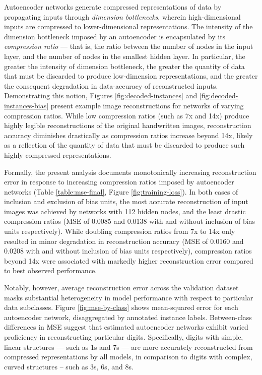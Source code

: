 
Autoencoder networks generate compressed representations of data by propagating inputs through \textit{dimension bottlenecks}, wherein high-dimensional inputs are compressed to lower-dimensional representations.
The intensity of the dimension bottleneck imposed by an autoencoder is encapsulated by its \textit{compression ratio} --- that is, the ratio between the number of nodes in the input layer, and the number of nodes in the smallest hidden layer.
In particular, the greater the intensity of dimension bottleneck, the greater the quantity of data that must be discarded to produce low-dimension representations, and the greater the consequent degradation in data-accuracy of reconstructed inputs.
Demonstrating this notion, Figures \ref{fig:decoded-instances} and \ref{fig:decoded-instances-bias} present example image reconstructions for networks of varying compression ratios.
While low compression ratios (such as 7x and 14x) produce highly legible reconstructions of the original handwritten images, reconstruction accuracy diminishes drastically as compression ratios increase beyond 14x, likely as a reflection of the quantity of data that must be discarded to produce such highly compressed representations.

Formally, the present analysis documents monotonically increasing reconstruction error in response to increasing compression ratios imposed by autoencoder networks (Table \ref{table:mse-final}, Figure \ref{fig:training-loss}).
In both cases of inclusion and exclusion of bias units, the most accurate reconstruction of input images was achieved by networks with 112 hidden nodes, and the least drastic compression ratios (MSE of 0.0085 and 0.0138 with and without inclusion of bias units respectively). 
While doubling compression ratios from 7x to 14x only resulted in minor degradation in reconstruction accuracy (MSE of 0.0160 and 0.0208 with and without inclusion of bias units respectively), compression ratios beyond 14x were associated with markedly higher reconstruction error compared to best observed performance.

Notably, however, average reconstruction error across the validation dataset masks substantial heterogeneity in model performance with respect to particular data subclasses.
Figure \ref{fig:mse-by-class} shows mean-squared error for each autoencoder network, disaggregated by annotated instance labels.
Between-class differences in MSE suggest that estimated autoencoder networks exhibit varied proficiency in reconstructing particular digits. 
Specifically, digits with simple, linear structures --- such as 1s and 7s --- are more accurately reconstructed from compressed representations by all models, in comparison to digits with complex, curved structures -- such as 3s, 6s, and 8s. 

